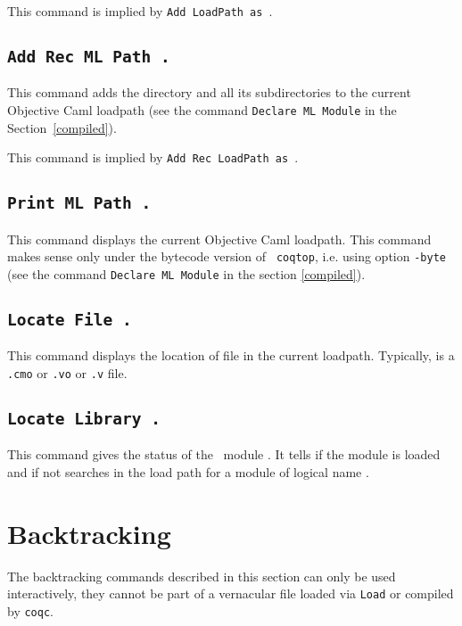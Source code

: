 \Rem This command is implied by {\tt Add LoadPath {\str} as {\dirpath}}.

\subsection[\tt Add Rec ML Path {\str}.]{\tt Add Rec ML Path {\str}.}
This command adds the directory {\str} and all its subdirectories 
to the current Objective Caml loadpath (see
the command {\tt Declare ML Module} in the Section~\ref{compiled}).

\Rem This command is implied by {\tt Add Rec LoadPath {\str} as {\dirpath}}.

\subsection[\tt Print ML Path {\str}.]{\tt Print ML Path {\str}.}
This command displays the current Objective Caml loadpath.
This command makes sense only under the bytecode version of {\tt
coqtop}, i.e. using option {\tt -byte} (see the
command {\tt Declare ML Module} in the section
\ref{compiled}).

\subsection[\tt Locate File {\str}.]{\tt Locate File {\str}.\label{Locate File}}
This command displays the location of file {\str} in the current loadpath.
Typically, {\str} is a \texttt{.cmo} or \texttt{.vo} or \texttt{.v} file.

\subsection[\tt Locate Library {\dirpath}.]{\tt Locate Library {\dirpath}.\label{Locate Library}}
This command gives the status of the \Coq\ module {\dirpath}. It tells if the
module is loaded and if not searches in the load path for a module
of logical name {\dirpath}.

\section{Backtracking}

The backtracking commands described in this section can only be used
interactively, they cannot be part of a vernacular file loaded via
{\tt Load} or compiled by {\tt coqc}.


